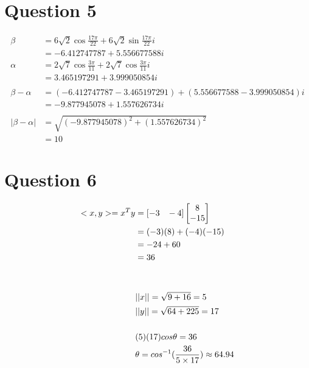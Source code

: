 \documentclass{article}
\begin{document}
\section{Question 5}  
\begin{align*}
    \beta &= 6\sqrt{2}\cos{\frac{17\pi}{22}}
    + 6\sqrt{2}\sin{\frac{17\pi}{22}}i
    \\ &= -6.412747787 + 5.556677588i 
    \\ 
    \alpha &= 2\sqrt{7}\cos{\frac{3\pi}{11}}
    + 2\sqrt{7}\cos{\frac{3\pi}{11}}i    
    \\ &= 3.465197291 + 3.999050854i
    \\ \\ 
    \beta - \alpha &= (-6.412747787-3.465197291)
    + (5.556677588 - 3.999050854)i 
    \\ &= -9.877945078 + 1.557626734i 
    \\ \\  
    |\beta-\alpha| &= \sqrt{(-9.877945078)^2+(1.557626734)^2} 
    \\ &= 10  
\end{align*}




\section{Question 6}
\begin{align*}
    <x, y> = x^{T}y &= [-3 \hspace{3mm}-4]\begin{bmatrix}8 \\ -15\end{bmatrix} 
    \\ &= (-3)(8) + (-4)(-15)  
    \\ &= -24 + 60 
    \\ &= 36 
    \\ \\ \\ 
    &||x|| = \sqrt{9 + 16} = 5 \\ 
    &||y|| = \sqrt{64 + 225} = 17 
    \\ \\ 
    &(5)(17)cos\theta = 36   \\ 
    &\theta = cos^{-1}(\frac{36}{5\times17}) \approx 64.94
\end{align*}
\end{document}
